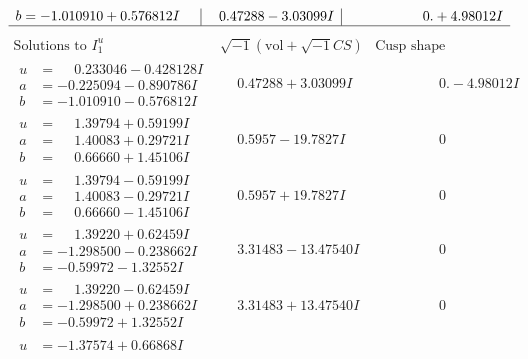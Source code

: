 \documentclass[1p]{elsarticle_modified}
\theoremstyle{definition}
\newcommand{\I}{\sqrt{-1}}
\begin{document}
$$\begin{array}{c|c|c}
\begin{aligned}
b &= -1.010910 + 0.576812 I\end{aligned}
 & \phantom{-}0.47288 - 3.03099 I & \phantom{-0.000000 -}0. + 4.98012 I\\
 \hline 
 \end{array}$$\newpage$$\begin{array}{c|c|c}  
\text{Solutions to }I^u_{1}& \I (\text{vol} + \sqrt{-1}CS) & \text{Cusp shape}\\
 \hline 
\begin{aligned}
u &= \phantom{-}0.233046 - 0.428128 I \\
a &= -0.225094 - 0.890786 I \\
b &= -1.010910 - 0.576812 I\end{aligned}
 & \phantom{-}0.47288 + 3.03099 I & \phantom{-0.000000 } 0. - 4.98012 I \\ \hline\begin{aligned}
u &= \phantom{-}1.39794 + 0.59199 I \\
a &= \phantom{-}1.40083 + 0.29721 I \\
b &= \phantom{-}0.66660 + 1.45106 I\end{aligned}
 & \phantom{-}0.5957 - 19.7827 I & \phantom{-0.000000 } 0 \\ \hline\begin{aligned}
u &= \phantom{-}1.39794 - 0.59199 I \\
a &= \phantom{-}1.40083 - 0.29721 I \\
b &= \phantom{-}0.66660 - 1.45106 I\end{aligned}
 & \phantom{-}0.5957 + 19.7827 I & \phantom{-0.000000 } 0 \\ \hline\begin{aligned}
u &= \phantom{-}1.39220 + 0.62459 I \\
a &= -1.298500 - 0.238662 I \\
b &= -0.59972 - 1.32552 I\end{aligned}
 & \phantom{-}3.31483 - 13.47540 I & \phantom{-0.000000 } 0 \\ \hline\begin{aligned}
u &= \phantom{-}1.39220 - 0.62459 I \\
a &= -1.298500 + 0.238662 I \\
b &= -0.59972 + 1.32552 I\end{aligned}
 & \phantom{-}3.31483 + 13.47540 I & \phantom{-0.000000 } 0 \\ \hline\begin{aligned}
u &= -1.37574 + 0.66868 I \\

\end{aligned}
\end{array}$$
\end{document}
